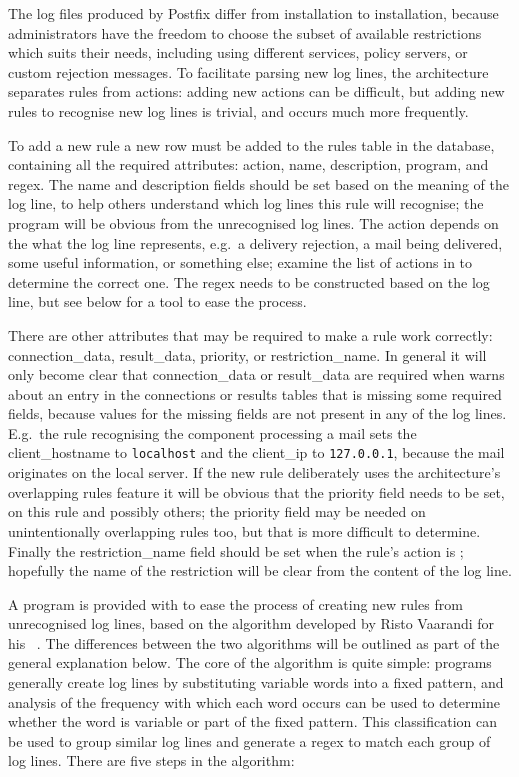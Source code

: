 The log files produced by Postfix differ from installation to installation,
because administrators have the freedom to choose the subset of available
restrictions which suits their needs, including using different
 services, policy servers, or custom rejection messages.  To
facilitate parsing new log lines, the architecture separates rules from
actions: adding new actions can be difficult, but adding new rules to
recognise new log lines is trivial, and occurs much more frequently.

To add a new rule a new row must be added to the rules table in the
database, containing all the required attributes: action, name,
description, program, and regex.  The name and description fields should be
set based on the meaning of the log line, to help others understand which
log lines this rule will recognise; the program will be obvious from the
unrecognised log lines.  The action depends on the what the log line
represents, e.g.\ a delivery rejection, a mail being delivered, some useful
information, or something else; examine the list of actions in
 to determine the correct
one.  The regex needs to be constructed based on the log line, but see
below for a tool to ease the process.

There are other attributes that may be required to make a rule work
correctly: connection\_data, result\_data, priority, or restriction\_name.
In general it will only become clear that connection\_data or result\_data
are required when \parsername{} warns about an entry in the connections or
results tables that is missing some required fields, because values for the
missing fields are not present in any of the log lines.  E.g.\ the rule
recognising the  component processing a mail sets the
client\_hostname to \texttt{localhost} and the client\_ip to
\texttt{127.0.0.1}, because the mail originates on the local server.  If
the new rule deliberately uses the architecture's overlapping rules feature
it will be obvious that the priority field needs to be set, on this rule
and possibly others; the priority field may be needed on unintentionally
overlapping rules too, but that is more difficult to determine.  Finally
the restriction\_name field should be set when the rule's action is
; hopefully the name of the restriction will be
clear from the content of the log line.

A program is provided with \parsername{} to ease the process of creating
new rules from unrecognised log lines, based on the algorithm developed by
Risto Vaarandi for his ~\cite{slct-paper}.  The differences
between the two algorithms will be outlined as part of the general
explanation below.  The core of the  algorithm is quite
simple: programs generally create log lines by substituting variable words
into a fixed pattern, and analysis of the frequency with which each word
occurs can be used to determine whether the word is variable or part of the
fixed pattern.  This classification can be used to group similar log lines
and generate a regex to match each group of log lines.  There are five steps
in the algorithm:

